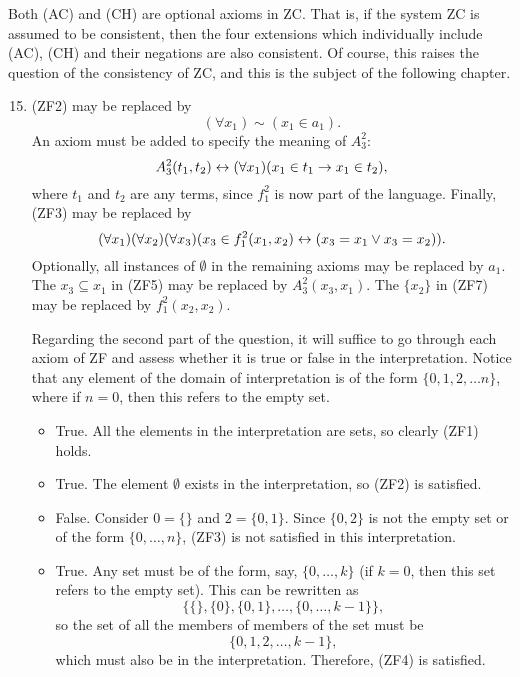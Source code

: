 Both (AC) and (CH) are optional axioms in ZC. That is, if the system ZC is assumed to be consistent, then the four extensions which individually include (AC), (CH) and their negations are also consistent. Of course, this raises the question of the consistency of ZC, and this is the subject of the following chapter.

\solutions{}
\begin{enumerate}
  \setcounter{enumi}{14}

  \item %
    (ZF2) may be replaced by
    \[(\forall x_1)\sim(x_1 \in a_1).\]
    An axiom must be added to specify the meaning of \(A^2_3\):
    \[A^2_3(t_1, t_2) \leftrightarrow (\forall x_1)(x_1 \in t_1 \rightarrow x_1 \in t_2),\]
    where \(t_1\) and \(t_2\) are any terms, since \(f^2_1\) is now part of the language. Finally, (ZF3) may be replaced by
    \[(\forall x_1)(\forall x_2)(\forall x_3)(x_3 \in f^2_1(x_1, x_2) \leftrightarrow (x_3 = x_1 \lor x_3 = x_2)).\]
    Optionally, all instances of \(\emptyset\) in the remaining axioms may be replaced by \(a_1\). The \(x_3 \subseteq x_1\) in (ZF5) may be replaced by \(A^2_3(x_3, x_1)\). The \(\{x_2\}\) in (ZF7) may be replaced by \(f^2_1(x_2, x_2)\).

    Regarding the second part of the question, it will suffice to go through each axiom of ZF and assess whether it is true or false in the interpretation. Notice that any element of the domain of interpretation is of the form \(\{0, 1, 2, \dots n\}\), where if \(n = 0\), then this refers to the empty set.
    \begin{itemize}
      \item True. All the elements in the interpretation are sets, so clearly (ZF1) holds.

      \item True. The element \(\emptyset\) exists in the interpretation, so (ZF2) is satisfied.

      \item False. Consider \(0 = \{\}\) and \(2 = \{0, 1\}\). Since \(\{0, 2\}\) is not the empty set or of the form \(\{0, \dots, n\}\), (ZF3) is not satisfied in this interpretation.

      \item True. Any set must be of the form, say, \(\{0, \dots, k\}\) (if \(k=0\), then this set refers to the empty set). This can be rewritten as
        \[\{\{\}, \{0\}, \{0, 1\}, \dots, \{0, \dots, k - 1\}\},\]
        so the set of all the members of members of the set must be
        \[\{0, 1, 2, \dots, k - 1\},\]
        which must also be in the interpretation. Therefore, (ZF4) is satisfied.


\end{itemize}
\end{enumerate}
